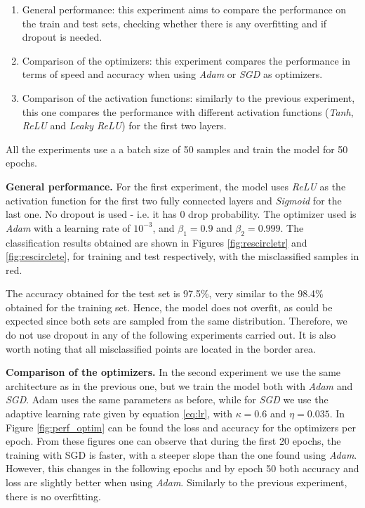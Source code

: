 \documentclass[10pt,conference,compsocconf]{IEEEtran}
\begin{document}
        \begin{enumerate}
            \item General performance: this experiment aims to compare the performance on the train and test sets, checking whether there is any overfitting and if dropout is needed.
            \item Comparison of the optimizers: this experiment compares the performance in terms of speed and accuracy when using \textit{Adam} or \textit{SGD} as optimizers.
            \item Comparison of the activation functions: similarly to the previous experiment, this one compares the performance with different activation functions (\textit{Tanh}, \textit{ReLU} and \textit{Leaky ReLU}) for the first two layers.
        \end{enumerate}

        All the experiments use a a batch size of 50 samples and train the model for 50 epochs.
        
        \textbf{General performance.} For the first experiment, the model uses \textit{ReLU} as the activation function for the first two fully connected layers and  \textit{Sigmoid}  for the last one. No dropout is used - i.e. it has  0 drop probability. The optimizer used is \textit{Adam} with a learning rate of $10^{-3}$, and $\beta_1 = 0.9$ and $\beta_2 = 0.999$.  The classification results obtained are shown in Figures \ref{fig:rescircletr} and \ref{fig:rescirclete}, for training and test respectively, with the misclassified samples in red. 
        

        
        The accuracy obtained for the test set is 97.5\%, very similar to the 98.4\% obtained for the training set. Hence, the model does not overfit, as could be expected since both sets are sampled from the same distribution. Therefore, we do not use dropout in any of the following experiments carried out.  It is also worth noting that all misclassified points are located in the border area.
        
        \textbf{Comparison of the optimizers.} In the second experiment we use the same architecture as in the previous one, but we train the model both with \textit{Adam} and \textit{SGD}. Adam uses the same parameters as before, while for \textit{SGD} we use the adaptive learning rate given by equation \ref{eq:lr}, with $\kappa=0.6$ and $\eta=0.035$. In Figure \ref{fig:perf_optim} can be found the loss and accuracy for the optimizers per epoch. From these figures one can observe that during the first 20 epochs, the training with SGD is faster, with a steeper slope than the one found using \textit{Adam}. However, this changes in the following epochs and  by epoch 50 both accuracy and loss are slightly better when using \textit{Adam}. Similarly to the previous experiment, there is no overfitting.
        
\end{document}
